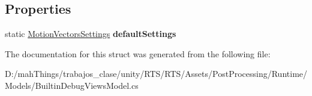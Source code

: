 \subsection*{Properties}
\begin{DoxyCompactItemize}
\item 
\mbox{\label{struct_unity_engine_1_1_post_processing_1_1_builtin_debug_views_model_1_1_motion_vectors_settings_a93b3d0cfc70da4574a94ed0ddd858250}} 
static \mbox{\hyperlink{struct_unity_engine_1_1_post_processing_1_1_builtin_debug_views_model_1_1_motion_vectors_settings}{Motion\+Vectors\+Settings}} {\bfseries default\+Settings}
\end{DoxyCompactItemize}


The documentation for this struct was generated from the following file\+:\begin{DoxyCompactItemize}
\item 
D\+:/mah\+Things/trabajos\+\_\+clase/unity/\+R\+T\+S/\+R\+T\+S/\+Assets/\+Post\+Processing/\+Runtime/\+Models/Builtin\+Debug\+Views\+Model.\+cs\end{DoxyCompactItemize}

